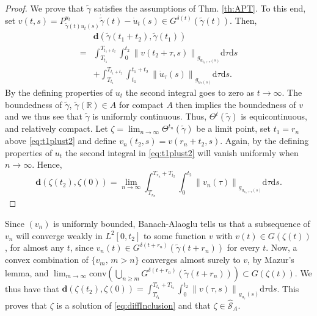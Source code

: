 \documentclass{article}
\newcommand{\BR}{\mathbb{R}}
\newcommand{\rd}{\mathrm{d}}
\newcommand{\bd}{\mathbf{d}}
\newcommand{\norm}[1]{\left\lVert#1\right\rVert}
\begin{document}
\begin{proof}
    We prove that $\tilde\gamma$ satisfies the assumptions of Thm. \ref{th:APT}. To this end, set $v(t,s)=P^{u_t}_{\tilde\gamma(t)u_t(s)}\dot{\tilde\gamma}(t)-\dot u_t(s)\in G^{\delta(t)}(\tilde\gamma(t))$. Then, 
    \begin{equation}\label{eq:t1plust2}
        \begin{aligned}
            &\bd(\tilde\gamma(t_1+t_2),\tilde\gamma(t_1))\\
            =& \int_{T_{t_1}}^{T_{t_1+t_2}}\int_0^{t_2} \norm{v(t_2+\tau,s)}_{g_{u_{t_2+\tau}(s)}}\rd \tau\rd s\\
            &+\int_{T_{t_1}}^{T_{t_1+t_2}}\int_{t_1}^{t_1+t_2}\norm{\dot u_\tau(s)}_{g_{u_\tau(s)}}\rd \tau\rd s.
        \end{aligned}
    \end{equation}
    By the defining properties of $u_t$ the second integral goes to zero as $t\to\infty$. The boundedness of $\tilde\gamma$, $\tilde\gamma(\BR)\in A$ for compact $A$ then implies the boundedness of $v$ and we thus see that $\tilde\gamma$ is uniformly continuous. Thus, $\Theta^t(\tilde\gamma)$ is equicontinuous, and relatively compact. Let $\zeta=\lim_{n\to\infty}\Theta^{t_n}(\tilde\gamma)$ be a limit point, set $t_1=r_n$ above \eqref{eq:t1plust2} and define $v_n(t_2,s)=v(r_n+t_2,s)$. Again, by the defining properties of $u_t$ the second integral in \eqref{eq:t1plust2} will vanish uniformly when $n\to\infty$. Hence, 
    \begin{equation}
        \bd(\zeta(t_2),\zeta(0))=\lim_{n\to\infty}\int_{T_{r_n}}^{T_{r_n}+T_{t_2}} \int_0^{t_2}\norm{v_n(\tau)}_{g_{u_{r_n+\tau}(s)}}\rd\tau\rd s.
    \end{equation}
\end{proof}
Since $(v_n)$ is uniformly bounded, Banach-Alaoglu tells us that a subsequence of $v_n$ will converge weakly in $L^2[0,t_2]$ to some function $v$ with $v(t)\in G(\zeta(t))$, for almost any $t$, since $v_n(t)\in G^{\delta(t+r_n)}(\tilde \gamma(t+r_n))$ for every $t$. Now, a convex combination of $\{v_m,\,m>n\}$ converges almost surely to $v$, by Mazur's lemma, and $\lim_{m\to\infty} \text{conv}\left(\bigcup_{n\geq m} G^{\delta(t+r_n)}(\tilde\gamma(t+r_n))\right)\subset G(\zeta(t))$. We thus have that $\bd(\zeta(t_2),\zeta(0))=\int_{T_{t_1}}^{T_{t_1}+T_{t_2}}\int_0^{t_2}\norm{v(\tau,s)}_{g_{u_\tau}(s)} \rd\tau\rd s$. This proves that $\zeta$ is a solution of \eqref{eq:diffInclusion} and that $\zeta\in \widehat{\mathcal{S}}_A$.
\end{document}
